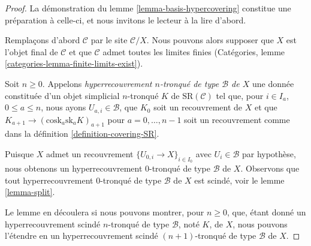 \begin{proof}
La démonstration du lemme \ref{lemma-basis-hypercovering}
constitue une préparation à celle-ci, et
nous invitons le lecteur à la lire d'abord.

\medskip\noindent
Remplaçons d'abord $\mathcal{C}$ par le site $\mathcal{C}/X$.
Nous pouvons alors supposer que $X$ est l'objet final
de $\mathcal{C}$ et que $\mathcal{C}$ admet toutes les limites finies
(Catégories, lemme \ref{categories-lemma-finite-limits-exist}).

\medskip\noindent
Soit $n \geq 0$. Appelons
{\it hyperrecouvrement $n$-tronqué de type $\mathcal{B}$ de $X$}
une donnée constituée d'un objet simplicial $n$-tronqué $K$
de $\text{SR}(\mathcal{C})$
tel que, pour $i \in I_a$, $0 \leq a \leq n$,
nous ayons $U_{a, i} \in \mathcal{B}$, que
$K_0$ soit un recouvrement de $X$ et que
$K_{a + 1} \to (\text{cosk}_a \text{sk}_a K)_{a + 1}$
pour $a = 0, \ldots, n - 1$
soit un recouvrement comme dans la définition \ref{definition-covering-SR}.

\medskip\noindent
Puisque $X$ admet un recouvrement $\{U_{0, i} \to X\}_{i \in I_0}$
avec $U_i \in \mathcal{B}$ par hypothèse, nous obtenons un hyperrecouvrement
$0$-tronqué de type $\mathcal{B}$ de $X$. Observons que tout hyperrecouvrement
$0$-tronqué de type $\mathcal{B}$ de $X$ est scindé, voir le
lemme \ref{lemma-split}.

\medskip\noindent
Le lemme en découlera si nous pouvons montrer, pour $n \geq 0$, que, étant donné un
hyperrecouvrement scindé $n$-tronqué de type $\mathcal{B}$, noté $K$, de $X$,
nous pouvons l'étendre en un
hyperrecouvrement scindé $(n + 1)$-tronqué de type $\mathcal{B}$ de $X$.


\end{proof}
